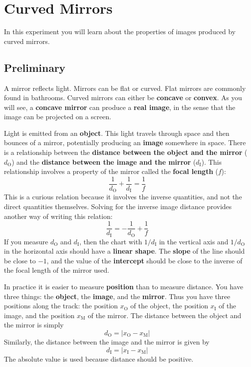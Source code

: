 \setcounter{chapter}{5}
\chapter{Curved Mirrors}
%
In this experiment you will learn about the properties of images produced by curved mirrors.
%
\section{Preliminary}
%
A mirror reflects light. Mirrors can be flat or curved. Flat mirrors are commonly found in bathrooms. Curved mirrors can either be \textbf{concave} or \textbf{convex}. As you will see, a \textbf{concave mirror} can produce a \textbf{real image}, in the sense that the image can be projected on a screen.

Light is emitted from an \textbf{object}. This light travels through space and then bounces of a mirror, potentially producing an \textbf{image} somewhere in space. There is a relationship between the \textbf{distance between the object and the mirror} ($d_{\text{O}}$) and the \textbf{distance between the image and the mirror} ($d_{\text{I}}$). This relationship involves a property of the mirror called the \textbf{focal length} ($f$):
\begin{equation}
    \frac{1}{d_{\text{O}}} + \frac{1}{d_{\text{I}}} = \frac{1}{f}
\end{equation}
This is a curious relation because it involves the inverse quantities, and not the direct quantities themselves. Solving for the inverse image distance provides another way of writing this relation:
\begin{equation}
    \frac{1}{d_{\text{I}}} = -\frac{1}{d_{\text{O}}} + \frac{1}{f}
\end{equation}
If you measure $d_{\text{O}}$ and $d_{\text{I}}$, then the chart with $1/d_{\text{I}}$ in the vertical axis and $1/d_{\text{O}}$ in the horizontal axis should have a \textbf{linear shape}. The \textbf{slope} of the line should be close to $-1$, and the value of the \textbf{intercept} should be close to the inverse of the focal length of the mirror used.

In practice it is easier to measure \textbf{position} than to measure distance. You have three things: the \textbf{object}, the \textbf{image}, and the \textbf{mirror}. Thus you have three positions along the track: the position $x_{\text{O}}$ of the object, the position $x_{\text{I}}$ of the image, and the position $x_{\text{M}}$ of the mirror. The distance between the object and the mirror is simply
\begin{equation}
    d_{\text{O}} = \left\vert x_{\text{O}} - x_{\text{M}} \right\vert
\end{equation}
Similarly, the distance between the image and the mirror is given by
\begin{equation}
    d_{\text{I}} = \left\vert x_{\text{I}} - x_{\text{M}} \right\vert
\end{equation}
The absolute value is used because distance should be positive.
%
